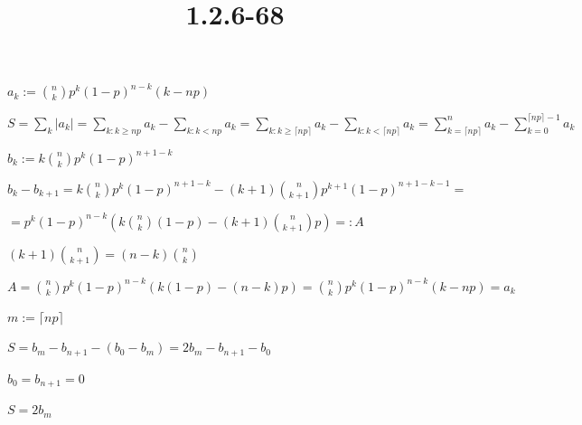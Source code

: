 \documentclass{article}
\title{1.2.6-68}
\begin{document}
\maketitle

$a_k := \binom{n}{k}p^k(1-p)^{n-k}(k-np)$

$S = \sum_k |a_k| = \sum_{k: k \geq np} a_k - \sum_{k: k < np} a_k = \sum_{k: k \geq \lceil np \rceil} a_k - \sum_{k: k < \lceil np \rceil} a_k = \sum_{k = \lceil np \rceil}^n a_k - \sum_{k = 0}^{\lceil np \rceil - 1} a_k$

$b_k := k \binom{n}{k}p^k(1-p)^{n+1-k}$

$b_k - b_{k+1} = k \binom{n}{k}p^k(1-p)^{n+1-k} - (k+1) \binom{n}{k+1}p^{k+1}(1-p)^{n+1-k-1} =$

$= p^k(1-p)^{n-k} \left(k\binom{n}{k}(1-p) - (k+1)\binom{n}{k+1}p\right) =: A$

$(k+1)\binom{n}{k+1} = (n-k)\binom{n}{k}$

$A = \binom{n}{k}p^k(1-p)^{n-k}(k(1-p) - (n-k)p) = \binom{n}{k}p^k(1-p)^{n-k}(k - np) = a_k$

$m := \lceil np \rceil$

$S = b_m - b_{n+1} - (b_0 - b_m) = 2b_m - b_{n+1} - b_0$

$b_0 = b_{n+1} = 0$

$S = 2b_m$
\end{document}
